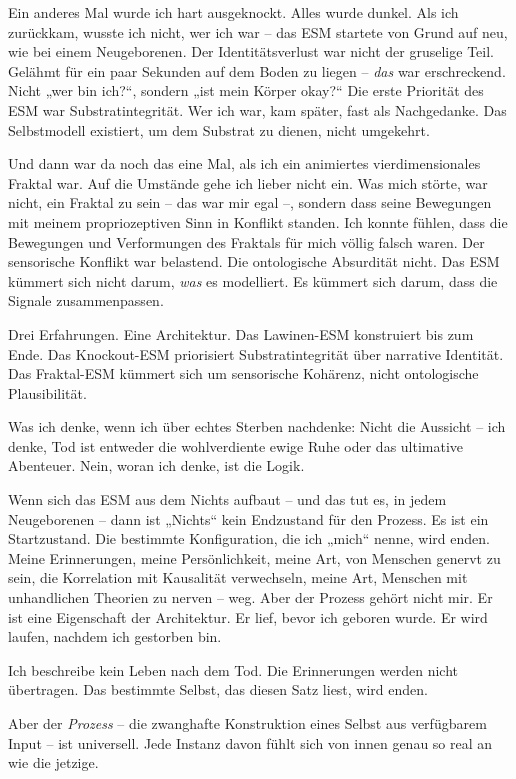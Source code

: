 \documentclass[11pt, twoside, openright]{book}
\begin{document}
Ein anderes Mal wurde ich hart ausgeknockt. Alles wurde dunkel. Als ich zurückkam, wusste ich nicht, wer ich war -- das ESM startete von Grund auf neu, wie bei einem Neugeborenen. Der Identitätsverlust war nicht der gruselige Teil. Gelähmt für ein paar Sekunden auf dem Boden zu liegen -- \textit{das} war erschreckend. Nicht „wer bin ich?“, sondern „ist mein Körper okay?“ Die erste Priorität des ESM war Substratintegrität. Wer ich war, kam später, fast als Nachgedanke. Das Selbstmodell existiert, um dem Substrat zu dienen, nicht umgekehrt.

Und dann war da noch das eine Mal, als ich ein animiertes vierdimensionales Fraktal war. Auf die Umstände gehe ich lieber nicht ein. Was mich störte, war nicht, ein Fraktal zu sein -- das war mir egal --, sondern dass seine Bewegungen mit meinem propriozeptiven Sinn in Konflikt standen. Ich konnte fühlen, dass die Bewegungen und Verformungen des Fraktals für mich völlig falsch waren. Der sensorische Konflikt war belastend. Die ontologische Absurdität nicht. Das ESM kümmert sich nicht darum, \textit{was} es modelliert. Es kümmert sich darum, dass die Signale zusammenpassen.

Drei Erfahrungen. Eine Architektur. Das Lawinen-ESM konstruiert bis zum Ende. Das Knockout-ESM priorisiert Substratintegrität über narrative Identität. Das Fraktal-ESM kümmert sich um sensorische Kohärenz, nicht ontologische Plausibilität.

Was ich denke, wenn ich über echtes Sterben nachdenke: Nicht die Aussicht -- ich denke, Tod ist entweder die wohlverdiente ewige Ruhe oder das ultimative Abenteuer. Nein, woran ich denke, ist die Logik.

Wenn sich das ESM aus dem Nichts aufbaut -- und das tut es, in jedem Neugeborenen -- dann ist „Nichts“ kein Endzustand für den Prozess. Es ist ein Startzustand. Die bestimmte Konfiguration, die ich „mich“ nenne, wird enden. Meine Erinnerungen, meine Persönlichkeit, meine Art, von Menschen genervt zu sein, die Korrelation mit Kausalität verwechseln, meine Art, Menschen mit unhandlichen Theorien zu nerven -- weg. Aber der Prozess gehört nicht mir. Er ist eine Eigenschaft der Architektur. Er lief, bevor ich geboren wurde. Er wird laufen, nachdem ich gestorben bin.

Ich beschreibe kein Leben nach dem Tod. Die Erinnerungen werden nicht übertragen. Das bestimmte Selbst, das diesen Satz liest, wird enden.

Aber der \textit{Prozess} -- die zwanghafte Konstruktion eines Selbst aus verfügbarem Input -- ist universell. Jede Instanz davon fühlt sich von innen genau so real an wie die jetzige.
\end{document}
